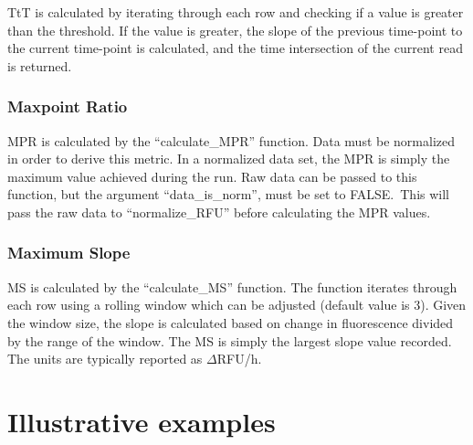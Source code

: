 \documentclass[preprint,12pt, a4paper]{elsarticle}
\begin{document}
            TtT is calculated by iterating through each row and checking if a value is greater than the threshold. If the value is greater, the slope of the previous time-point to the current time-point is calculated, and the time intersection of the current read is returned.

        \subsubsection{Maxpoint Ratio}
            MPR is calculated by the ``calculate\_MPR'' function. Data must be normalized in order to derive this metric. In a normalized data set, the MPR is simply the maximum value achieved during the run. Raw data can be passed to this function, but the argument ``data\_is\_norm'', must be set to FALSE.\ This will pass the raw data to ``normalize\_RFU'' before calculating the MPR values.

        \subsubsection{Maximum Slope}
            MS is calculated by the ``calculate\_MS'' function. The function iterates through each row using a rolling window which can be adjusted (default value is 3). Given the window size, the slope is calculated based on change in fluorescence divided by the range of the window. The MS is simply the largest slope value recorded. The units are typically reported as $\Delta$RFU/h.
    
\section{Illustrative examples}


\end{document}
